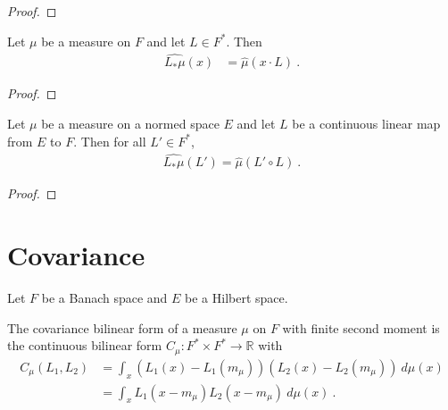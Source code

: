 \begin{proof}\leanok

\end{proof}


\begin{lemma}\label{lem:charFun_map_eq_charFunDual_smul}
  \mathlibok
Let $\mu$ be a measure on $F$ and let $L \in F^*$. Then
\begin{align*}
  \widehat{L_*\mu}(x) &= \hat{\mu}(x \cdot L) \: .
\end{align*}
\end{lemma}

\begin{proof}\leanok

\end{proof}


\begin{lemma}\label{lem:charFunDual_map}
  \mathlibok
Let $\mu$ be a measure on a normed space $E$ and let $L$ be a continuous linear map from $E$ to $F$.
Then for all $L' \in F^*$,
\begin{align*}
  \widehat{L_*\mu}(L') = \hat{\mu}(L' \circ L) \: .
\end{align*}
\end{lemma}

\begin{proof}\leanok

\end{proof}



\section{Covariance}
\label{sec:covariance}

Let $F$ be a Banach space and $E$ be a Hilbert space.

\begin{definition}[Covariance]\label{def:covarianceBilin}
  \mathlibok
The covariance bilinear form of a measure $\mu$ on $F$ with finite second moment is the continuous bilinear form $C_\mu : F^* \times F^* \to \mathbb{R}$ with
\begin{align*}
  C_\mu(L_1, L_2)
  &= \int_x (L_1(x) - L_1(m_\mu)) (L_2(x) - L_2(m_\mu)) \: d\mu(x)
  \\
  &= \int_x L_1(x - m_\mu) L_2(x- m_\mu) \: d\mu(x)
  \: .
\end{align*}
\end{definition}

